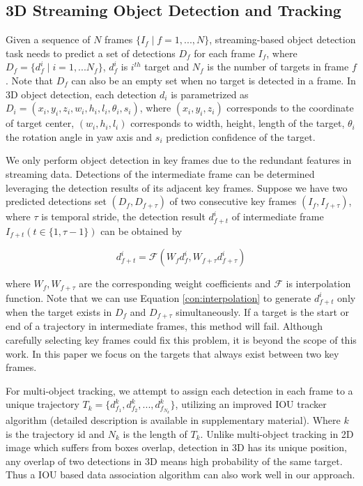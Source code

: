 \documentclass[letterpaper, 10 pt, conference]{ieeeconf}  %
\begin{document}
\subsection{3D Streaming Object Detection and Tracking}

Given a sequence of $N$ frames $\{I_f \mid f = 1, ..., N\}$, streaming-based object detection task needs to predict a set of detections $D_f$ for each frame $I_f$, where $D_f = \{d^i_f \mid i = 1,...N_f\}$, $d^i_f$ is $i^{th}$ target and $N_f$ is the number of targets in frame $f$. Note that $D_f$ can also be an empty set when no target is detected in a frame. In 3D object detection, each detection $d_i$ is parametrized as $D_i = (x_i, y_i, z_i, w_i, h_i, l_i, \theta_i, s_i)$, where $(x_i, y_i, z_i)$ corresponds to the coordinate of target center, $(w_i, h_i, l_i)$ corresponds to width, height, length of the target, $\theta_i$ the rotation angle in yaw axis and $s_i$ prediction confidence of the target.

We only perform object detection in key frames due to the redundant features in streaming data. Detections of the intermediate frame can be determined leveraging the detection results of its adjacent key frames. Suppose we have two predicted detections set $(D_f, D_{f+\tau})$ of two consecutive key frames $(I_f, I_{f+\tau})$, where $\tau$ is temporal stride, the detection result $d^i_{f+t}$  of intermediate frame $I_{f+t} (t \in \{1, \tau-1\})$ can be obtained by

\begin{equation}
d^i_{f+t} = \mathcal{F}(W_f d^i_f, W_{f+\tau} d^i_{f+\tau}) \label{con:interpolation}
\end{equation}

where $W_f, W_{f+\tau}$ are the corresponding weight coefficients and $\mathcal{F}$ is interpolation function. Note that we can use Equation \eqref{con:interpolation} to generate $d^i_{f+t}$ only when the target exists in $D_f$ and $D_{f+\tau}$ simultaneously. If a target is the start or end of a trajectory in intermediate frames, this method will fail. Although carefully selecting key frames could fix this problem, it is beyond the scope of this work. In this paper we focus on the targets that always exist between two key frames.

For multi-object tracking, we attempt to assign each detection in each frame to a unique trajectory $T_k = \{d^k_{f_1}, d^k_{f_2}, ..., d^k_{f_{N_k}}\}$, utilizing an improved IOU tracker algorithm\cite{bochinski2018extending} (detailed description is available in supplementary material). Where $k$ is the trajectory id and $N_k$ is the length of $T_k$. Unlike multi-object tracking in 2D image which suffers from boxes overlap, detection in 3D has its unique position, any overlap of two detections in 3D means high probability of the same target. Thus a IOU based data association algorithm can also work well in our approach.
\end{document}
